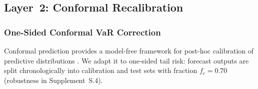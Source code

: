\documentclass[preprint,11pt,authoryear]{elsarticle}
\newcommand{\1}{\boldsymbol{1}}
\begin{document}
\subsection{Layer~2: Conformal Recalibration}
\label{sec:layer2}

\subsubsection{One-Sided Conformal VaR Correction}
\label{sec:cqr_var}

Conformal prediction provides a model-free framework for post-hoc calibration of predictive distributions \citep{vovk2005algorithmic,romano2019conformalized}. We adapt it to one-sided tail risk: forecast outputs are split chronologically into calibration and test sets with fraction $f_c = 0.70$ (robustness in Supplement~S.4).
\end{document}
